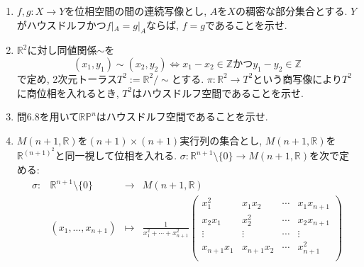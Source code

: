 \documentclass[dvipdfmx,a4paper,11pt]{article}
\newcommand{\R}{\mathbb{R}}
\newcommand{\Z}{\mathbb{Z}}
\theoremstyle{definition}
\begin{document}
\begin{enumerate}[label=\textbf{問}7.\arabic*]
\item $f,g : X \rightarrow Y$を位相空間の間の連続写像とし, $A$を$X$の稠密な部分集合とする. 
$Y$がハウスドルフかつ$f|_{A} =g|_{A}$ならば, $f =g$であることを示せ. 



\item \label{torus} $\R^{2}$に対し同値関係$\sim$を
$$
(x_1, y_1)\sim (x_2, y_2) \Leftrightarrow x_1 - x_2 \in \Z \text{かつ} y_1 - y_2 \in \Z 
$$
で定め, 2次元トーラス$T^2 := \R^2/\sim$とする.
$\pi : \R^2 \rightarrow T^2$という商写像により$T^2$に商位相を入れるとき, $T^2$はハウスドルフ空間であることを示せ.



	

\item 問6.8を用いて$\R\mathbb{P}^{n}$はハウスドルフ空間であることを示せ. 

\item $M(n+1, \R)$を$(n+1) \times (n+1)$実行列の集合とし, $M(n+1, \R) $を$\R^{(n+1)^2}$と同一視して位相を入れる. 
$\sigma : \R^{n+1} \setminus \{0\} \rightarrow  M(n+1, \R) $を次で定める:
{\footnotesize
$$
\begin{matrix}
\sigma : & \R^{n+1} \setminus \{0\} &\rightarrow & M(n+1, \R) \\
&(x_1, \ldots, x_{n+1})&\mapsto & 
\frac{1}{x_{1}^{2} + \cdots + x_{n+1}^{2} }
 \begin{pmatrix}
 x_{1}^{2} & x_1x_2& \cdots&x_1x_{n+1} \\ 
x_2x_1& x_{2}^{2}& \cdots&x_2x_{n+1} \\ 
\vdots &\vdots& \cdots& \vdots \\ 
x_{n+1}x_1&  x_{n+1}x_2& \cdots&x_{n+1}^{2} \\ 
\end{pmatrix}
\end{matrix}
$$
}


\end{enumerate}
\end{document}
